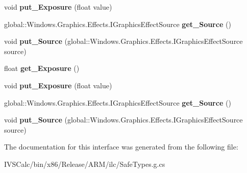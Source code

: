 \begin{DoxyCompactItemize}
void {\bfseries put\+\_\+\+Exposure} (float value)
\item 
\mbox{\label{interface_microsoft_1_1_graphics_1_1_canvas_1_1_effects_1_1_i_exposure_effect_a79e10b828da17b64688522fdf34da98b}} 
global\+::\+Windows.\+Graphics.\+Effects.\+I\+Graphics\+Effect\+Source {\bfseries get\+\_\+\+Source} ()
\item 
\mbox{\label{interface_microsoft_1_1_graphics_1_1_canvas_1_1_effects_1_1_i_exposure_effect_acb4229c8aabe612f5f1c7898033e5826}} 
void {\bfseries put\+\_\+\+Source} (global\+::\+Windows.\+Graphics.\+Effects.\+I\+Graphics\+Effect\+Source source)
\item 
\mbox{\label{interface_microsoft_1_1_graphics_1_1_canvas_1_1_effects_1_1_i_exposure_effect_a1188ad6764c93c08d490ac661c4032b4}} 
float {\bfseries get\+\_\+\+Exposure} ()
\item 
\mbox{\label{interface_microsoft_1_1_graphics_1_1_canvas_1_1_effects_1_1_i_exposure_effect_a2c5a92f7fb62eb7eb49b18388e03bc0c}} 
void {\bfseries put\+\_\+\+Exposure} (float value)
\item 
\mbox{\label{interface_microsoft_1_1_graphics_1_1_canvas_1_1_effects_1_1_i_exposure_effect_a79e10b828da17b64688522fdf34da98b}} 
global\+::\+Windows.\+Graphics.\+Effects.\+I\+Graphics\+Effect\+Source {\bfseries get\+\_\+\+Source} ()
\item 
\mbox{\label{interface_microsoft_1_1_graphics_1_1_canvas_1_1_effects_1_1_i_exposure_effect_acb4229c8aabe612f5f1c7898033e5826}} 
void {\bfseries put\+\_\+\+Source} (global\+::\+Windows.\+Graphics.\+Effects.\+I\+Graphics\+Effect\+Source source)
\end{DoxyCompactItemize}


The documentation for this interface was generated from the following file\+:\begin{DoxyCompactItemize}
\item 
I\+V\+S\+Calc/bin/x86/\+Release/\+A\+R\+M/ilc/Safe\+Types.\+g.\+cs\end{DoxyCompactItemize}
